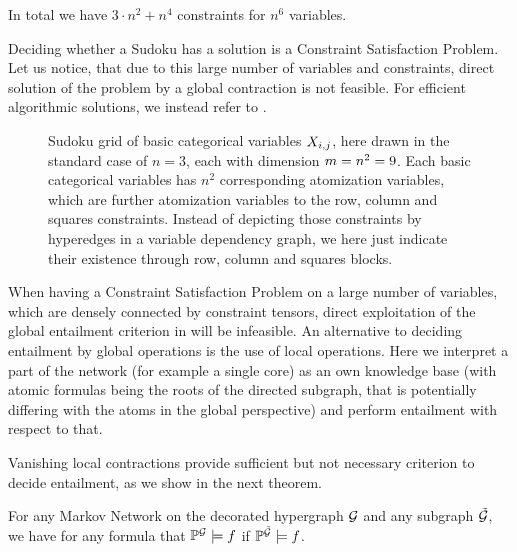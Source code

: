 \begin{example}[Sudoku]
	In total we have $3\cdot n^2 + n^4$ constraints for $n^6$ variables.

	Deciding whether a Sudoku has a solution is a Constraint Satisfaction Problem.
	Let us notice, that due to this large number of variables and constraints, direct solution of the problem by a global contraction is not feasible.
	For efficient algorithmic solutions, we instead refer to .

	\begin{figure}
	\begin{center}
		
	\end{center}
	\caption{
	Sudoku grid of basic categorical variables $X_{i,j}$, here drawn in the standard case of $n=3$, each with dimension $m=n^2=9$.
	Each basic categorical variables has $n^2$ corresponding atomization variables, which are further atomization variables to the row, column and squares constraints.
	Instead of depicting those constraints by hyperedges in a variable dependency graph, we here just indicate their existence through row, column and squares blocks.
	}\label{fig:sudokuGrid}
	\end{figure}
\end{example}




\label{subsec:LocalEntailment}

When having a Constraint Satisfaction Problem on a large number of variables, which are densely connected by constraint tensors, direct exploitation of the global entailment criterion in  will be infeasible.
An alternative to deciding entailment by global operations is the use of local operations.
Here we interpret a part of the network (for example a single core) as an own knowledge base (with atomic formulas being the roots of the directed subgraph, that is potentially differing with the atoms in the global perspective) and perform entailment with respect to that.


Vanishing local contractions provide sufficient but not necessary criterion to decide entailment, as we show in the next theorem.

\begin{theorem}\label{}
	For any Markov Network on the decorated hypergraph $\mathcal{G}$ and any subgraph $\tilde{\mathcal{G}}$, we have for any formula that $\mathbb{P}^{\mathcal{G}}\models f$ if $\mathbb{P}^{\tilde{\mathcal{G}}}\models f$.
\end{theorem}

